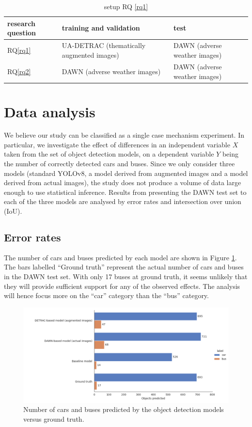 \documentclass[]{article}
\begin{document}
\begin{table}[H]
	\centering
	\begin{tabular}{lll}
		\toprule
		\textbf{research question} & \textbf{training and validation} & \textbf{test} \\
		\midrule
		RQ\ref{rq1} & UA-DETRAC (thematically augmented images) & DAWN (adverse weather images) \\
		RQ\ref{rq2} & DAWN (adverse weather images) & DAWN (adverse weather images) \\
		\bottomrule
	\end{tabular}
	\caption{setup RQ \ref{rq1}}
	\label{table:setuprq}
\end{table}
\section{Data analysis}

	We believe our study can be classified as a single case mechanism experiment. In particular, we investigate the effect of differences in an independent variable $X$ taken from the set of object detection models, on a dependent variable $Y$ being the number of correctly detected cars and buses. Since we only consider three models (standard YOLO{\small v8}, a model derived from augmented images and a model derived from actual images), the study does not produce a volume of data large enough to use statistical inference. Results from presenting the DAWN test set to each of the three models are analysed by error rates and intersection over union (IoU).
	
\subsection{Error rates}
	
	The number of cars and buses predicted by each model are shown in Figure \ref{fig:counts}. The bars labelled ``Ground truth'' represent the actual number of cars and buses in the DAWN test set. With only 17 buses at ground truth, it seems unlikely that they will provide sufficient support for any of the observed effects. The analysis will hence focus more on the ``car'' category than the ``bus'' category.  
	
	\begin{figure}[h]
		\centering
		\includegraphics[width=120mm]{objectPredictionCounts.png}
		\caption{Number of cars and buses predicted by the object detection models versus ground truth.}
		\label{fig:counts}
	\end{figure}
\end{document}
